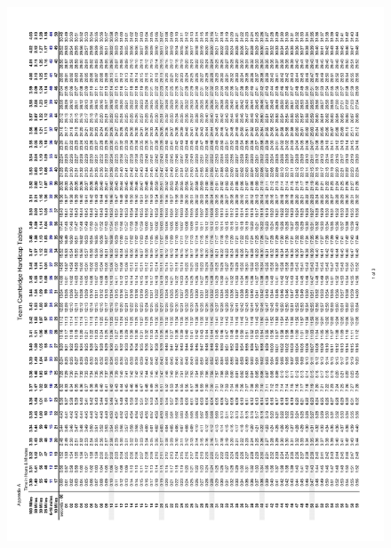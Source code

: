 \begin{figure}[H]
    \includegraphics[width=\textwidth]{./TeamCambridgeSpec/page7.pdf}
\end{figure}


